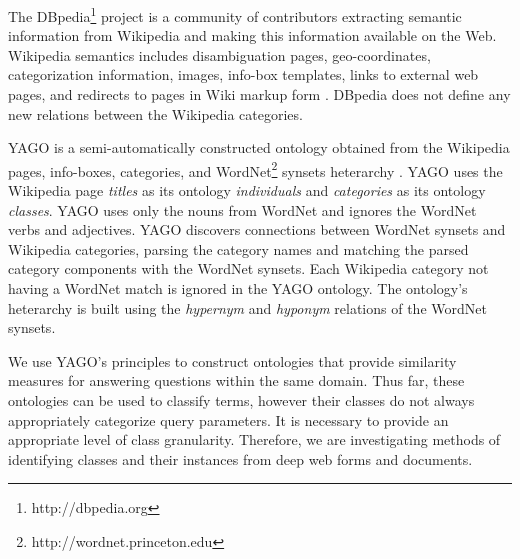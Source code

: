 
The DBpedia\footnote{http://dbpedia.org} project is a community of contributors extracting semantic information from Wikipedia and making this information available on the Web. Wikipedia semantics includes disambiguation pages, geo-coordinates, categorization information, images, info-box templates, links to external web pages,  and redirects to pages in Wiki markup form \cite{Bizer2009}.  DBpedia does not define any new relations between the Wikipedia categories.  


YAGO is a semi-automatically constructed ontology obtained from the Wikipedia pages, info-boxes, categories, and WordNet\footnote{http://wordnet.princeton.edu} synsets heterarchy \cite{Suchanek2009phd}. YAGO uses the Wikipedia page \emph{titles} as its ontology \emph{individuals} and \emph{categories} as its ontology \emph{classes}. YAGO uses only the nouns from WordNet and ignores the WordNet verbs and adjectives.  YAGO discovers connections between WordNet synsets and Wikipedia categories, parsing the category names and matching the parsed category components with the WordNet synsets. Each Wikipedia category not having a WordNet match is ignored in the YAGO ontology.  The ontology's heterarchy is built using the \textit{hypernym} and \textit{hyponym} relations of the WordNet synsets.  

We use YAGO's principles to construct ontologies that provide similarity measures for answering questions within the same domain.  Thus far, these ontologies can be used to classify terms, however their classes do not always appropriately categorize query parameters.  It is necessary to provide an appropriate level of class granularity.  Therefore, we are investigating  methods of identifying classes and their instances from deep web forms and documents.


